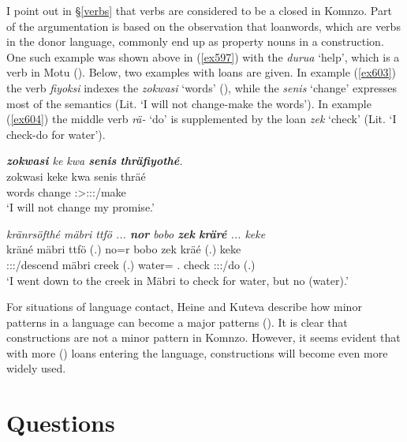 I point out in \S{}\ref{verbs} that verbs are considered to be a closed  in Komnzo. Part of the argumentation is based on the observation that loanwords, which are verbs in the donor language, commonly end up as property nouns in a  construction. One such example was shown above in (\ref{ex597}) with the  \emph{durua} `help', which is a  verb in Motu (\citealt[61]{Turnerlister:1935motu}). Below, two examples with  loans are given. In example (\ref{ex603}) the verb \emph{fiyoksi} indexes the  \emph{zokwasi} `words' (\Stpl), while the  \emph{senis} `change' expresses most of the semantics (Lit. `I will not change-make the words'). In example (\ref{ex604}) the middle verb \emph{rä-} `do' is supplemented by the  loan \emph{zek} `check' (Lit. `I check-do for water').

\begin{exe}
	\ex \emph{\textbf{zokwasi} ke kwa \textbf{senis} \textbf{thräfiyothé}.}\\
	\gll zokwasi keke kwa senis thräé\\
	words \Neg{} \Fut{} change \Fsg:\Sbj>\Stpl:\Obj:\Irr:\Pfv/make\\
	\trans `I will not change my promise.'
	\label{ex603}
\end{exe}
\begin{exe}
	\ex \emph{kränrsöfthé mäbri ttfö ... \textbf{nor} bobo \textbf{zek} \textbf{kräré} ... keke}\\
	\gll kräné mäbri ttfö (.) no=r bobo zek kräé (.) keke\\
	\Fsg:\Sbj:\Irr:\Pfv/descend mäbri creek (.) water=\Purp{} \Med.\All{} check \Fsg:\Sbj:\Irr:\Pfv/do (.) \Neg\\
	\trans `I went down to the creek in Mäbri to check for water, but no (water).'\\
	\label{ex604}
\end{exe}

For situations of language contact, Heine and Kuteva describe how minor patterns in a language can become a major patterns (\citeyear[44]{Heine:2005wp}). It is clear that  constructions are not a minor pattern in Komnzo. However, it seems evident that with more () loans entering the language,  constructions will become even more widely used.

\section{Questions}\label{questions}

